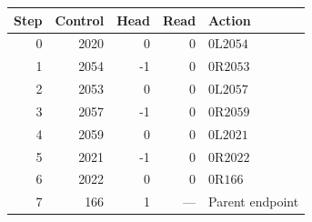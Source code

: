 \begin{center}\small
\begin{tabular}{@{}rrrrl@{}}
\toprule
Step & Control & Head & Read & Action\\
\midrule
0&2020&0&0&$0\mathrm{L}2054$\\
1&2054&-1&0&$0\mathrm{R}2053$\\
2&2053&0&0&$0\mathrm{L}2057$\\
3&2057&-1&0&$0\mathrm{R}2059$\\
4&2059&0&0&$0\mathrm{L}2021$\\
5&2021&-1&0&$0\mathrm{R}2022$\\
6&2022&0&0&$0\mathrm{R}166$\\
7&166&1&---&Parent endpoint\\
\bottomrule
\end{tabular}
\end{center}
